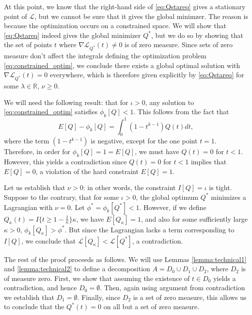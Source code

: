 \documentclass[12pt]{article}
\begin{document}
At this point, we know that the right-hand side of \eqref{eq:Qstareq}
gives a stationary point of $\mathcal{L}$, but we cannot be sure that
it gives the global minimzer.  The reason is because the optimization
occurs on a constrained space.  We will show that \eqref{eq:Qstareq}
indeed gives the global minimizer $Q^*$, but we do so by showing that
the set of points $t$ where $\nabla \mathcal{L}_{Q^*}(t) \neq 0$ is of
zero measure.  Since sets of zero measure don't affect the integrals
defining the optimization problem \eqref{eq:constrained_optim}, we
conclude there exists a global optimal solution with
$\nabla \mathcal{L}_{Q^*}(t) = 0$ everywhere, which is therefore given
explicitly by \eqref{eq:Qstareq} for some $\lambda \in \mathbb{R}$, $\nu \geq 0.$

We will need the following result: that for $\iota
> 0$, any solution to \eqref{eq:constrained_optim} satisfies
$\phi_k[Q] < 1$.  This follows from the fact that
\[
E[Q] - \phi_k[Q] = \int_0^1 (1-t^{k-1}) Q(t) dt,
\]
where the term $(1-t^{k-1})$ is negative, except for the one point $t
= 1$.  Therefore, in order for $\phi_k[Q] = 1 = E[Q]$, we must have
$Q(t) = 0$ for $t < 1$.  However, this yields a contradiction since
$Q(t) = 0$ for $t < 1$ implies that $E[Q] = 0$, a violation of the
hard constraint $E[Q] = 1$.

Let us establish that $\nu > 0$: in other words, the constraint $I[Q]
= \iota$ is tight.  Suppose to the contrary, that for
some $\iota > 0$, the global optimum $Q^*$ minimizes a Lagrangian with
$\nu = 0$.  Let $\phi^* = \phi_k[Q^*] < 1.$ However, if we define
$Q_\kappa(t) = I\{t \geq 1 - \frac{1}{\kappa}\} \kappa$, we have
$E[Q_\kappa] = 1$, and also for some sufficiently large $\kappa > 0$,
$\phi_k[Q_\kappa] > \phi^*$.  But since the Lagrangian lacks a term
corresponding to $I[Q]$, we conclude that $\mathcal{L}[Q_\kappa]
< \mathcal{L}[Q^*]$, a contradiction.

The rest of the proof proceeds as follows.  We will use
Lemmas \ref{lemma:technical1} and \ref{lemma:technical2} to define a
decomposition $A = D_0 \cup D_1 \cup D_2$, where $D_2$ is of measure
zero.  First, we show that assuming the existence of $t \in D_0$
yields a contradiction, and hence $D_0 = \emptyset$.  Then, again
using argument from contradiction we establish that $D_1 = \emptyset$.
Finally, since $D_2$ is a set of zero measure, this allows us to
conclude that the $Q^*(t) = 0$ on all but a set of zero measure.
\end{document}
